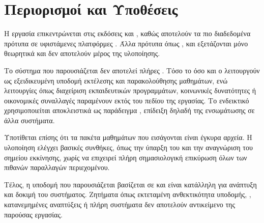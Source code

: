 \section{Περιορισμοί και Υποθέσεις}

Η εργασία επικεντρώνεται στις εκδόσεις  και , καθώς αποτελούν τα πιο διαδεδομένα πρότυπα
σε υφιστάμενες πλατφόρμες . Άλλα πρότυπα όπως ,  και  εξετάζονται
μόνο θεωρητικά και δεν αποτελούν μέρος της υλοποίησης.

Το σύστημα που παρουσιάζεται δεν αποτελεί πλήρες . Τόσο το  
όσο και ο  λειτουργούν ως εξειδικευμένη υποδομή εκτέλεσης και παρακολούθησης μαθημάτων, ενώ λειτουργίες
όπως διαχείριση εκπαιδευτικών προγραμμάτων, κοινωνικές δυνατότητες ή οικονομικές συναλλαγές παραμένουν εκτός του πεδίου της εργασίας.
Το ενδεικτικό  χρησιμοποιείται αποκλειστικά ως παράδειγμα , επίδειξη δηλαδή της ενσωμάτωσης σε άλλα συστήματα.

Υποτίθεται επίσης ότι τα πακέτα μαθημάτων που εισάγονται είναι έγκυρα  αρχεία. Η υλοποίηση ελέγχει βασικές συνθήκες,
όπως την ύπαρξη του  και την αναγνώριση του σημείου εκκίνησης, χωρίς να επιχειρεί πλήρη σημασιολογική
επικύρωση όλων των πιθανών παραλλαγών περιεχομένου.

Τέλος, η υποδομή που παρουσιάζεται βασίζεται σε  και είναι κατάλληλη για ανάπτυξη και δοκιμή του συστήματος.
Ζητήματα όπως εκτεταμένη ανθεκτικότητα υποδομής, , κατανεμημένες αναπτύξεις ή πλήρη συστήματα 
δεν αποτελούν αντικείμενο της παρούσας εργασίας.